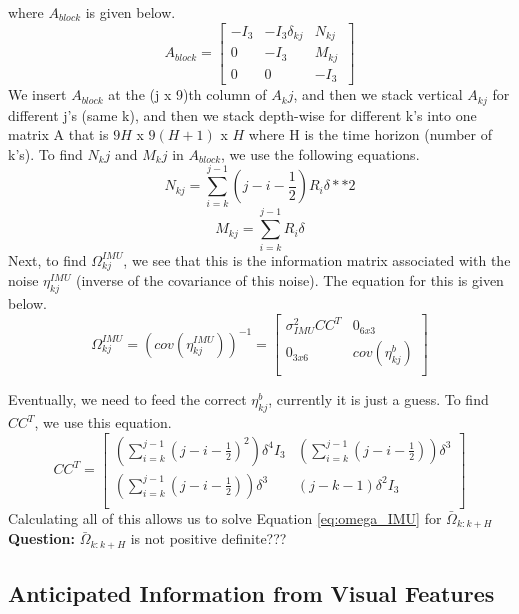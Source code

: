 where $A_{block}$ is given below.
\[A_{block} = 
\begin{bmatrix}
-I_3 & -I_3\delta_{kj} & N_{kj} \\
0 & -I_3 & M_{kj} \\
0 & 0 & -I_3 \
\end{bmatrix}\]
We insert $A_{block}$ at the (j x 9)th column of $A_kj$, and then we stack vertical $A_{kj}$ for different j's (same k), and then we stack depth-wise for different k's into one matrix A that is $9H$ x $9(H+1)$ x $H$ where H is the time horizon (number of k's). To find $N_kj$ and $M_kj$ in $A_{block}$, we use the following equations. 
\begin{equation}
    N_{kj} = \sum_{i=k}^{j-1}(j-i-\frac{1}{2})R_i\delta**2
\end{equation}
\begin{equation}
    M_{kj} = \sum_{i=k}^{j-1}R_i\delta
\end{equation}
Next, to find $\Omega_{kj}^{IMU}$, we see that this is the information matrix associated with the noise $\eta_{kj}^{IMU}$ (inverse of the covariance of this noise). The equation for this is given below. 
\[\Omega_{kj}^{IMU} = (cov(\eta_{kj}^{IMU}))^{-1} =
\begin{bmatrix}
\sigma_{IMU}^2CC^T & 0_{6x3} \\
0_{3x6} & cov(\eta_{kj}^b) \\
\end{bmatrix}
\]

Eventually, we need to feed the correct $\eta_{kj}^b$, currently it is just a guess. To find $CC^T$, we use this equation.
\[CC^T =
\begin{bmatrix}
(\sum_{i=k}^{j-1}(j-i-\frac{1}{2})^2)\delta^4 I_3 & (\sum_{i=k}^{j-1}(j-i-\frac{1}{2}))\delta^3 \\
(\sum_{i=k}^{j-1}(j-i-\frac{1}{2}))\delta^3  &
(j-k-1)\delta^2I_3 \\
\end{bmatrix}
\]
Calculating all of this allows us to solve Equation \ref{eq:omega_IMU} for $\bar{\Omega}_{k:k+H}$ \\
\textbf{Question: } $\bar{\Omega}_{k:k+H}$ is not positive definite???

\subsection{Anticipated Information from Visual Features}\label{sub:info_features}

